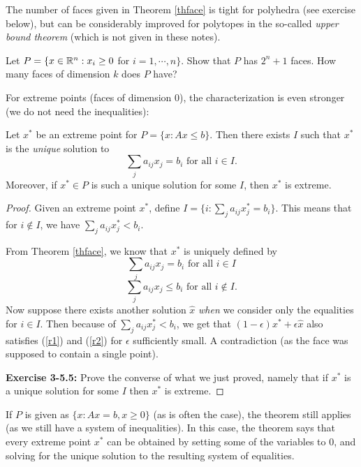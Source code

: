 \documentclass[12pt]{article}
\begin{document}
The number of faces given in Theorem \ref{thface} is tight for
polyhedra (see exercise below), but can be considerably improved for
polytopes in the so-called {\it upper bound theorem} (which is not given in these notes).

\begin{exercises}
\item
Let $P=\{x\in {\mathbb R}^n: x_i\geq 0$ for $i=1,\cdots, n\}$. Show that $P$
has $2^n+1$ faces. How many faces of dimension $k$ does $P$ have? 
\end{exercises}

For extreme points (faces of dimension 0), the characterization is
even stronger (we do not need the inequalities):

\begin{theorem}
Let $x^*$ be an extreme point for $P=\{x: Ax \leq b\}$. Then there
exists $I$ such that $x^*$ is the {\it unique} solution to 
$$ \sum_j a_{ij} x_j = b_i \mbox{ for all } i\in I. $$
Moreover, if $x^* \in P$ is such a unique solution for some $I$, then $x^*$ is extreme. 
 \end{theorem}

\begin{proof}
Given an extreme point $x^*$, define $I=\{i: \sum_j a_{ij}
x^*_j=b_i\}$. This means that for $i\notin I$, we have $\sum_j a_{ij}
x^*_j<b_i$.  

From Theorem \ref{thface}, we know that $x^*$ is uniquely
defined by 
\begin{equation} \label{r1}
 \sum_j a_{ij} x_j = b_i \mbox{ for all } i\in I
\end{equation}
\begin{equation} \label{r2}
\sum_j a_{ij} x_j \leq b_i \mbox{ for all } i\notin I. 
\end{equation}
Now suppose there exists another solution $\hat{x}$ {\it when} we
consider only the equalities for $i\in I$. Then because of $\sum_j a_{ij}
x^*_j<b_i$, we get that $(1-\epsilon)x^* + \epsilon \hat{x}$ also
satisfies (\ref{r1}) and (\ref{r2}) for $\epsilon$ sufficiently
small. A contradiction (as the face was supposed to contain a single point). 

\noindent \textbf{Exercise 3-5.5:} Prove the converse of what we just proved, namely that if $x^*$ is a unique solution for some $I$ then $x^*$ is extreme.
\end{proof}

If $P$ is given as $\{x: Ax=b, x\geq 0\}$ (as is often the case), the
theorem still applies (as we still have a system of inequalities). In
this case, the theorem says that every extreme point $x^*$ can be obtained
by setting some of the variables to 0, and solving for the unique
solution to the resulting system of equalities.
\end{document}
